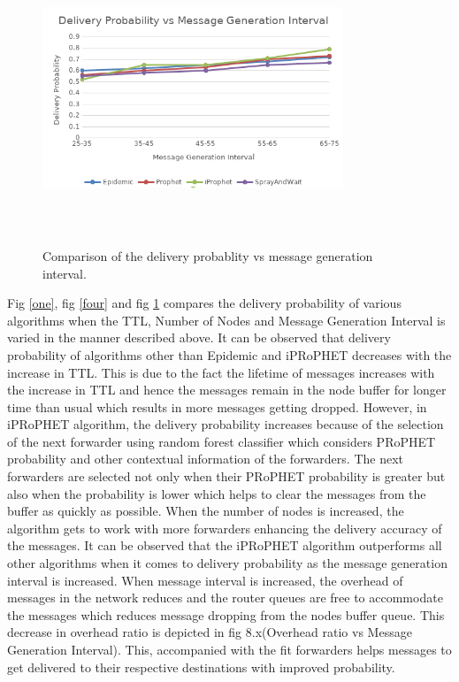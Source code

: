 \documentclass[10pt,journal]{IEEEtran}
\begin{document}
\begin{figure}[H]
	\centering
	\includegraphics[width=9cm, height=8cm]{del_prob_vs_msg_gen_inter.png}\\
	\caption{Comparison of the delivery probablity vs message generation interval.}
	\label{eight}
\end{figure}


Fig \ref{one}, fig \ref{four} and fig \ref{eight} compares the delivery probability of various algorithms when the TTL, Number of Nodes and Message Generation Interval is varied in the manner described above. It can be observed that delivery probability of algorithms other than Epidemic and iPRoPHET decreases with the increase in TTL. This is due to the fact the lifetime of messages increases with the increase in TTL and hence the messages remain in the node buffer for longer time than usual which results in more messages getting dropped. However, in iPRoPHET algorithm, the delivery probability increases because of the selection of the next forwarder using random forest classifier which considers PRoPHET probability and other contextual information of the forwarders. The next forwarders are selected not only when their PRoPHET probability is greater but also when the probability is lower which helps to clear the messages from the buffer as quickly as possible. 
When the number of nodes is increased, the algorithm gets to work with more forwarders enhancing the delivery accuracy of the messages.
It can be observed that the iPRoPHET algorithm outperforms all other algorithms when it comes to delivery probability as the message generation interval is increased. When message interval is increased, the overhead of messages in the network reduces  and the router queues are free to accommodate the messages which reduces message dropping from the nodes buffer queue. This decrease in overhead ratio is depicted in fig 8.x(Overhead ratio vs Message Generation Interval). This, accompanied with the fit forwarders helps messages to get delivered to their respective destinations with improved probability.
\end{document}
